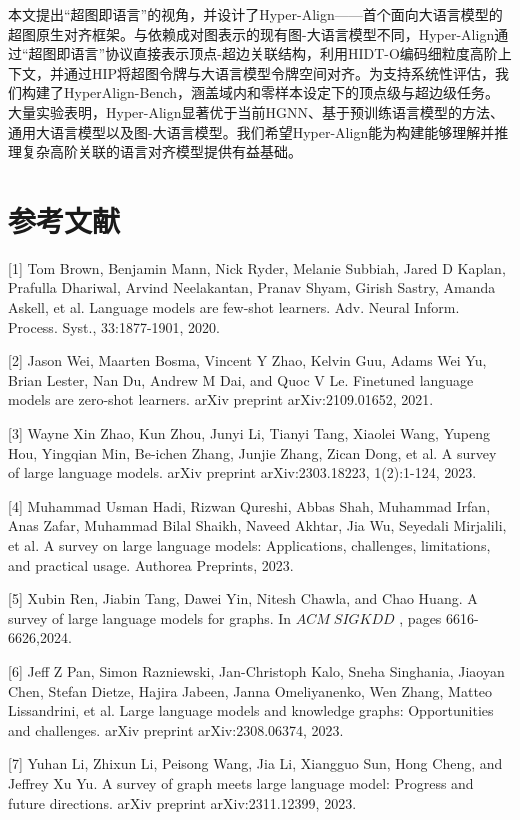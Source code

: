 \documentclass[10pt]{article}
\begin{document}
本文提出“超图即语言”的视角，并设计了Hyper-Align——首个面向大语言模型的超图原生对齐框架。与依赖成对图表示的现有图-大语言模型不同，Hyper-Align通过“超图即语言”协议直接表示顶点-超边关联结构，利用HIDT-O编码细粒度高阶上下文，并通过HIP将超图令牌与大语言模型令牌空间对齐。为支持系统性评估，我们构建了HyperAlign-Bench，涵盖域内和零样本设定下的顶点级与超边级任务。大量实验表明，Hyper-Align显著优于当前HGNN、基于预训练语言模型的方法、通用大语言模型以及图-大语言模型。我们希望Hyper-Align能为构建能够理解并推理复杂高阶关联的语言对齐模型提供有益基础。

\section*{参考文献}

{[}1{]} Tom Brown, Benjamin Mann, Nick Ryder, Melanie Subbiah, Jared D Kaplan, Prafulla Dhariwal, Arvind Neelakantan, Pranav Shyam, Girish Sastry, Amanda Askell, et al. Language models are few-shot learners. Adv. Neural Inform. Process. Syst., 33:1877-1901, 2020.

{[}2{]} Jason Wei, Maarten Bosma, Vincent Y Zhao, Kelvin Guu, Adams Wei Yu, Brian Lester, Nan Du, Andrew M Dai, and Quoc V Le. Finetuned language models are zero-shot learners. arXiv preprint arXiv:2109.01652, 2021.

{[}3{]} Wayne Xin Zhao, Kun Zhou, Junyi Li, Tianyi Tang, Xiaolei Wang, Yupeng Hou, Yingqian Min, Be-ichen Zhang, Junjie Zhang, Zican Dong, et al. A survey of large language models. arXiv preprint arXiv:2303.18223, 1(2):1-124, 2023.

{[}4{]} Muhammad Usman Hadi, Rizwan Qureshi, Abbas Shah, Muhammad Irfan, Anas Zafar, Muhammad Bilal Shaikh, Naveed Akhtar, Jia Wu, Seyedali Mirjalili, et al. A survey on large language models: Applications, challenges, limitations, and practical usage. Authorea Preprints, 2023.

{[}5{]} Xubin Ren, Jiabin Tang, Dawei Yin, Nitesh Chawla, and Chao Huang. A survey of large language models for graphs. In \({ACM}\;{SIGKDD}\) , pages 6616-6626,2024.

{[}6{]} Jeff Z Pan, Simon Razniewski, Jan-Christoph Kalo, Sneha Singhania, Jiaoyan Chen, Stefan Dietze, Hajira Jabeen, Janna Omeliyanenko, Wen Zhang, Matteo Lissandrini, et al. Large language models and knowledge graphs: Opportunities and challenges. arXiv preprint arXiv:2308.06374, 2023.

{[}7{]} Yuhan Li, Zhixun Li, Peisong Wang, Jia Li, Xiangguo Sun, Hong Cheng, and Jeffrey Xu Yu. A survey of graph meets large language model: Progress and future directions. arXiv preprint arXiv:2311.12399, 2023.
\end{document}
